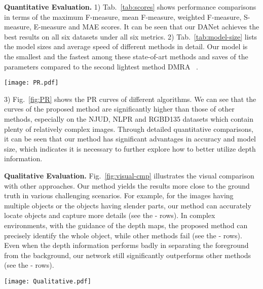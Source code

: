 \documentclass[runningheads]{llncs}
\begin{document}
\textbf{Quantitative Evaluation.}
 1) Tab.~\ref{tab:scores} shows performance comparisons in terms of the maximum F-measure, mean F-measure, weighted F-measure, S-measure, E-measure and MAE scores. 
It can be seen that our DANet achieves the best results on all six datasets  under all six metrics. 
2) Tab.~\ref{tab:model-size} lists the model sizes and average speed of different methods in detail. Our model is the smallest and the fastest among these state-of-art methods and saves  of the parameters compared to the second lightest method DMRA~\cite{DMRA} .
\begin{figure*}
  \centering
  \texttt{[image: PR.pdf]}
  \caption{Precision (vertical axis) recall (horizontal axis) curves on six RGB-D salient object detection datasets.}
  \label{fig:PR}
  \end{figure*} 
3) Fig.~\ref{fig:PR} shows the PR curves of different algorithms. We can see that the curves of the proposed method are significantly higher than those of other methods, especially on the NJUD, NLPR and RGBD135 datasets which contain plenty of relatively complex images.  
Through detailed quantitative comparisons, it can be seen that our method has significant advantages in accuracy and model size, which indicates it is necessary to further explore how to better utilize depth information. 


 \textbf{Qualitative Evaluation.}
 Fig.~\ref{fig:visual-cmp} illustrates the visual comparison with other approaches. Our method yields the results more close to the ground truth in various challenging scenarios. For example, for the images having multiple objects or the objects having slender parts, our method can accurately locate objects and capture more details (see the  -  rows). In complex environments, with the guidance of the depth maps, the proposed method can precisely identify the whole object, while other methods fail (see the  -  rows). Even when the depth information performs badly in separating the foreground from the background, our network still significantly outperforms other methods (see the  -  rows). 

  
\begin{figure*}[ht]
  \centering
  \texttt{[image: Qualitative.pdf]}
  \caption{Visual comparison between our results and the state-of-the-art methods.}
  \label{fig:visual-cmp}
\end{figure*}
\end{document}
